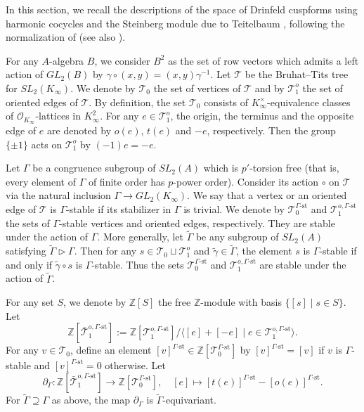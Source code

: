 \documentclass[11pt]{amsart}
\theoremstyle{plain}
\theoremstyle{definition}
\newcommand{\st}{\mathrm{st}}
\newcommand{\cO}{\mathcal{O}}
\newcommand{\cT}{\mathcal{T}}
\newcommand{\bZ}{\mathbb{Z}}
\newcommand{\Kinf}{K_\infty}
\begin{document}
In this section, we recall the descriptions of the space of Drinfeld cuspforms using harmonic cocycles and the Steinberg module due to Teitelbaum \cite[p.~506]
{Tei},
following the normalization of \cite[\S5.3]{Boeckle} (see also \cite[\S2]{Ha_DMBF}).

For any $A$-algebra $B$, we consider $B^2$ as the set of row vectors which admits a left action of $\mathit{GL}_2(B)$ by $\gamma\circ (x,y)=(x,y)\gamma^{-1}$.
Let $\cT$ be the Bruhat--Tits tree for $\mathit{SL}_2(\Kinf)$. We denote by $\cT_0$ the set of vertices of $\cT$ and by $\cT_1^o$ the set of oriented edges of $
\cT$. 
By 
definition, the set $\cT_0$ consists of 
$\Kinf^\times$-equivalence classes of $\cO_{\Kinf}$-lattices in $\Kinf^2$. For any $e\in \cT_1^o$, the origin, the terminus and the opposite edge of $e$ are denoted 
by $o(e)$, $t(e)$ and $-e$, respectively. Then the group $\{\pm 1\}$ acts on $\cT_1^o$ by $(-1)e=-e$. 

Let $\Gamma$ be a congruence subgroup of $\mathit{SL}_2(A)$ which is $p'$-torsion free (that is, every element of $\Gamma$ of finite order has $p$-power order).
Consider its action $\circ$ on $\cT$ via the natural inclusion $\Gamma\to \mathit{GL}_2(\Kinf)$. We say that 
a vertex or an oriented edge of $\cT$ is $\Gamma$-stable if 
its 
stabilizer in $
\Gamma$ is trivial. We denote by $\cT_0^{\Gamma\text{-}\st}$ and $\cT_1^{o,\Gamma\text{-}\st}$ the sets of $\Gamma$-stable vertices 
and oriented edges, respectively. They are stable under the action of $\Gamma$. More generally, let $\tilde{\Gamma}$ be any subgroup
of $\mathit{SL}_2(A)$ satisfying $\tilde{\Gamma}\rhd \Gamma$.
Then for any $s\in \cT_0\sqcup \cT_1^o$ and $\tilde{\gamma}\in \tilde{\Gamma}$, the element $s$ is $\Gamma$-stable if and only if $\tilde{\gamma}\circ s$ is $
\Gamma$-stable. Thus the sets $\cT_0^{\Gamma\text{-}\st}$ and $\cT_1^{o,\Gamma\text{-}\st}$ are stable under the action of 
$\tilde{\Gamma}$.

For any set $S$, we denote by $\bZ[S]$ the free $\bZ$-module with basis $\{[s]\mid s\in S\}$. 
Let
\[
\bZ[\bar{\cT}_1^{o,\Gamma\text{-}\st}]:=\bZ[\cT_1^{o,\Gamma\text{-}\st}]/\langle [e]+[-e]\mid e\in \cT_1^{o,\Gamma\text{-}\st}\rangle.
\]
For any $v\in \cT_0$, define an element $[v]^{\Gamma\text{-}\st}\in \bZ[\cT_0^{\Gamma\text{-}\st}]$ by $[v]^{\Gamma\text{-}\st}=[v]$ if $v$ is $\Gamma$-stable
 and $[v]^{\Gamma\text{-}\st}=0$ otherwise. Let
\[
\partial_\Gamma:\bZ[\bar{\cT}_1^{o,\Gamma\text{-}\st}]\to \bZ[{\cT}_0^{\Gamma\text{-}\st}],\quad [e]\mapsto [t(e)]^{\Gamma\text{-}\st}-[o(e)]^{\Gamma\text{-}
\st}.
\]
For $\tilde{\Gamma}\supseteq \Gamma$ as above, the map $\partial_\Gamma$ is $\tilde{\Gamma}$-equivariant.
\end{document}
